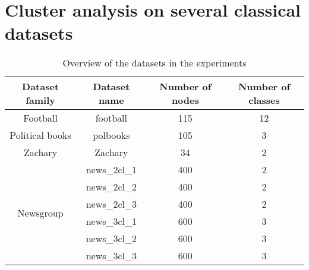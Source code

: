 \documentclass{article}
\begin{document}
\newpage
\section{Cluster analysis on several classical datasets}
\begin{table}[H]
	\centering
	\begin{tabular}{|c|c|c|c|}
		\hline
		Dataset family & Dataset name & Number of nodes & Number of classes \\
		\hline
		Football & football & 115 & 12 \\
		\hline
		Political books & polbooks & 105 & 3 \\
		\hline
		Zachary & Zachary & 34 & 2 \\
		\hline
		\multirow{6}{*}{Newsgroup} & news\_2cl\_1 & 400 & 2 \\
		\cline{2-4}
		 & news\_2cl\_2 & 400 & 2 \\
		\cline{2-4}
		 & news\_2cl\_3 & 400 & 2 \\
		\cline{2-4}
		 & news\_3cl\_1 & 600 & 3 \\
		\cline{2-4}
		 & news\_3cl\_2 & 600 & 3 \\
		\cline{2-4}
		 & news\_3cl\_3 & 600 & 3 \\
		\hline
	\end{tabular}
	\caption{Overview of the datasets in the experiments\label{table:datasets}}
\end{table}
\end{document}
